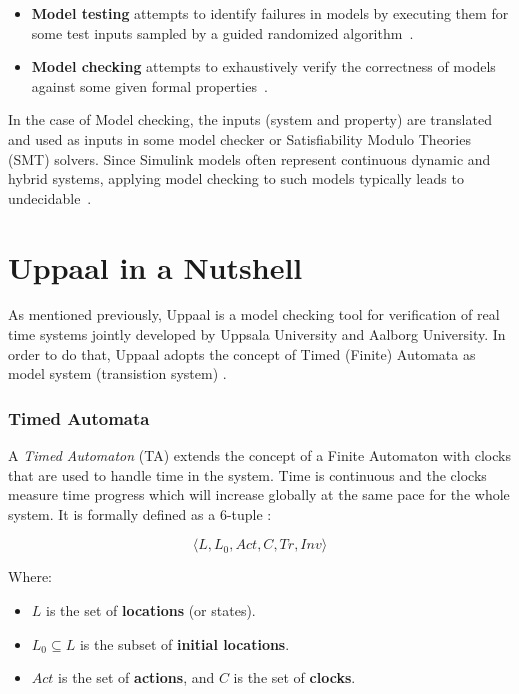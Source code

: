 \begin{itemize}
    \item \textbf{Model testing} attempts to identify failures in models by executing them for some test inputs sampled by a guided randomized algorithm~\cite{Haque2022}.

    \item \textbf{Model checking} attempts to exhaustively verify the correctness of models against some given formal properties~\cite{Haque2022}.
\end{itemize}

In the case of Model checking, the inputs (system and property) are translated and used as inputs in some model checker or Satisfiability Modulo Theories (SMT) solvers. Since Simulink models often represent continuous dynamic and hybrid systems, applying model checking to such models typically leads to undecidable~\cite{Chakraborty2011}.


\section{Uppaal in a Nutshell}

As mentioned previously, Uppaal is a model checking tool for verification of real time systems jointly developed by Uppsala University and Aalborg University. In order to do that, Uppaal adopts the concept of Timed (Finite) Automata as model system (transistion system) \cite{Behrmann2006}. 

\subsubsection{Timed Automata}

A \textit{Timed Automaton} (TA) extends the concept of a Finite Automaton with clocks that are used to handle time in the system. Time is continuous and the clocks measure time progress which will increase globally at the same pace for the whole system. It is formally defined as a 6-tuple \cite{baier2008principles}:



\[
\langle L, L_0, Act, C, Tr, Inv \rangle
\]

Where:
\begin{itemize}
    \item \( L \) is the set of \textbf{locations} (or states).
    \item \( L_0 \subseteq L \) is the subset of \textbf{initial locations}.
    \item \( Act \) is the set of \textbf{actions}, and \( C \) is the set of \textbf{clocks}.
\end{itemize}

